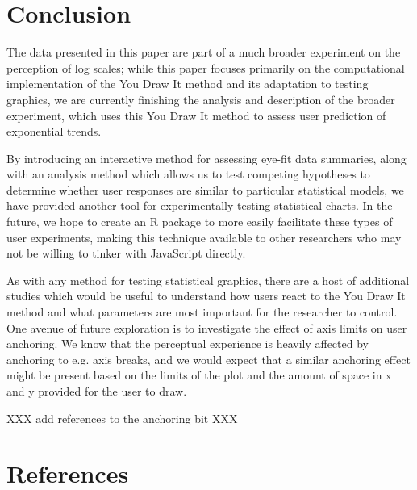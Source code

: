 \documentclass[
  letterpaper,
  DIV=11,
  numbers=noendperiod]{scrartcl}
\newcommand{\svp}[1]{{\textcolor{RedOrange}{#1}}}
\begin{document}
\hypertarget{conclusion}{%
\section{Conclusion}\label{conclusion}}

\svp{The data presented in this paper are part of a much broader experiment on the perception of log scales; while this paper focuses primarily on the computational implementation of the You Draw It method and its adaptation to testing graphics, we are currently finishing the analysis and description of the broader experiment, which uses this You Draw It method to assess user prediction of exponential trends.}

\svp{By introducing an interactive method for assessing eye-fit data summaries, along with an analysis method which allows us to test competing hypotheses to determine whether user responses are similar to particular statistical models, we have provided another tool for experimentally testing statistical charts. In the future, we hope to create an R package to more easily facilitate these types of user experiments, making this technique available to other researchers who may not be willing to tinker with JavaScript directly.}

\svp{As with any method for testing statistical graphics, there are a host of additional studies which would be useful to understand how users react to the You Draw It method and what parameters are most important for the researcher to control. One avenue of future exploration is to investigate the effect of axis limits on user anchoring. We know that the perceptual experience is heavily affected by anchoring to e.g. axis breaks, and we would expect that a similar anchoring effect might be present based on the limits of the plot and the amount of space in x and y provided for the user to draw.}

XXX add references to the anchoring bit XXX

\hypertarget{references}{%
\section*{References}\label{references}}
\end{document}
